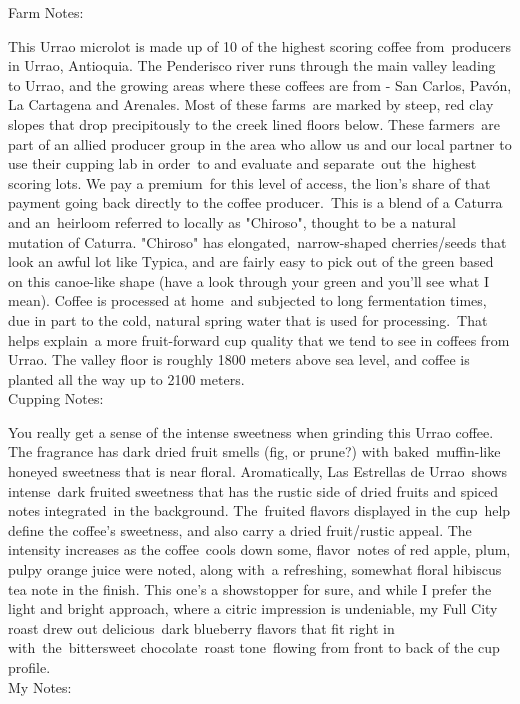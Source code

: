 \documentclass[10pt,twoside,footinclude=true,headinclude=true]{scrbook} %
\newlength{\mysize}
\newcommand{\myfontsize}[1]{
  \setlength{\mysize}{#1pt}
  \fontsize{\mysize}{1.2\mysize}
  \selectfont
}
\begin{document}

\newpage
\vspace*{-2.2em}
\raggedright
\normalsize
Farm Notes: \\
\myfontsize{8}
This Urrao microlot is made up of 10 of the highest scoring coffee from producers in Urrao, Antioquia. The Penderisco river runs through the main valley leading to Urrao, and the growing areas where these coffees are from - San Carlos, Pavón, La Cartagena and Arenales. Most of these farms are marked by steep, red clay slopes that drop precipitously to the creek lined floors below. These farmers are part of an allied producer group in the area who allow us and our local partner to use their cupping lab in order to and evaluate and separate out the highest scoring lots. We pay a premium for this level of access, the lion's share of that payment going back directly to the coffee producer. This is a blend of a Caturra and an heirloom referred to locally as "Chiroso", thought to be a natural mutation of Caturra. "Chiroso" has elongated, narrow-shaped cherries/seeds that look an awful lot like Typica, and are fairly easy to pick out of the green based on this canoe-like shape (have a look through your green and you'll see what I mean). Coffee is processed at home and subjected to long fermentation times, due in part to the cold, natural spring water that is used for processing. That helps explain a more fruit-forward cup quality that we tend to see in coffees from Urrao. The valley floor is roughly 1800 meters above sea level, and coffee is planted all the way up to 2100 meters. \\
\medskip
\normalsize
Cupping Notes: \\
\myfontsize{8}
You really get a sense of the intense sweetness when grinding this Urrao coffee. The fragrance has dark dried fruit smells (fig, or prune?) with baked muffin-like honeyed sweetness that is near floral. Aromatically, Las Estrellas de Urrao shows intense dark fruited sweetness that has the rustic side of dried fruits and spiced notes integrated in the background. The fruited flavors displayed in the cup help define the coffee's sweetness, and also carry a dried fruit/rustic appeal. The intensity increases as the coffee cools down some, flavor notes of red apple, plum, pulpy orange juice were noted, along with a refreshing, somewhat floral hibiscus tea note in the finish. This one's a showstopper for sure, and while I prefer the light and bright approach, where a citric impression is undeniable, my Full City roast drew out delicious dark blueberry flavors that fit right in with the bittersweet chocolate roast tone flowing from front to back of the cup profile. \\
\medskip
\normalsize
My Notes:
\end{document}
